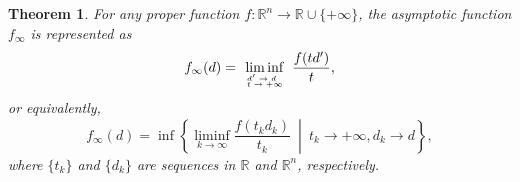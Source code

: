 \documentclass[a4paper,11pt, oneside]{book}
\newtheorem{thm}{Theorem}[section]
\theoremstyle{definition}
\newcommand{\RealNumberSet}{\mathbb{R}}
\newcommand{\NDemenstionalRealEuclideanSpace}{\mathbb{R}^n}
\newcommand{\ExtendedRealValuedFunction}[2]{{#1}: {#2} \to \RealNumberSet \cup \{+\infty\}}
\begin{document}
\begin{thm}
  For any proper function $\ExtendedRealValuedFunction{f}{\NDemenstionalRealEuclideanSpace}$, the asymptotic function $f_{\infty}$ is represented as
  \begin{equation}
    f_{\infty}(d) = \liminf_{
      \def\arraystretch{0.5}
      \tiny
      \begin{array}{lcr}
      d' \to d \\
      t \to +\infty
      \end{array}
      } \frac{f(td')}{t},
  \end{equation}
  or equivalently,
  \begin{equation}
    f_{\infty}(d) = \inf \left\{ \liminf_{k \to \infty} \frac{f(t_k d_k)}{t_k} \:\middle|\: t_k \to +\infty, d_k \to d \right\},
  \end{equation}
  where $\{t_k\}$ and $\{d_k\}$ are sequences in $\RealNumberSet$ and  $\NDemenstionalRealEuclideanSpace$, respectively.
\end{thm}
\end{document}
